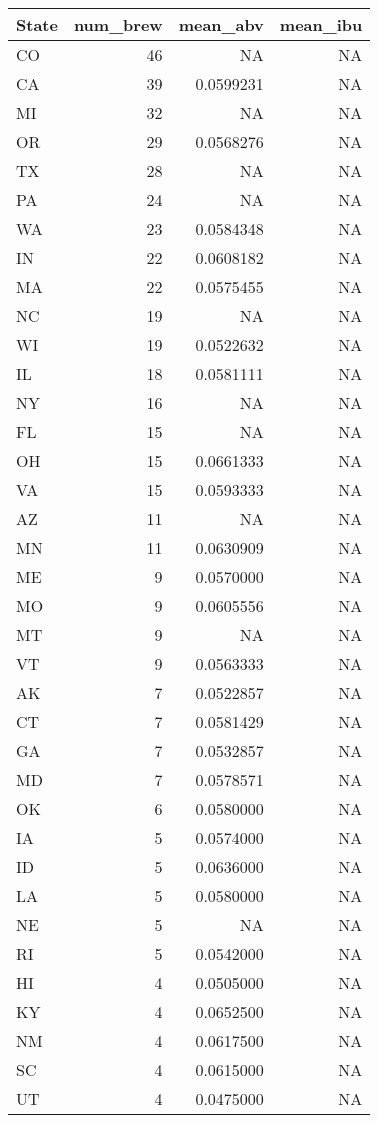 \documentclass[
]{article}
\begin{document}
\begin{longtable}[]{@{}lrrr@{}}
\toprule()
State & num\_brew & mean\_abv & mean\_ibu \\
\midrule()
\endhead
CO & 46 & NA & NA \\
CA & 39 & 0.0599231 & NA \\
MI & 32 & NA & NA \\
OR & 29 & 0.0568276 & NA \\
TX & 28 & NA & NA \\
PA & 24 & NA & NA \\
WA & 23 & 0.0584348 & NA \\
IN & 22 & 0.0608182 & NA \\
MA & 22 & 0.0575455 & NA \\
NC & 19 & NA & NA \\
WI & 19 & 0.0522632 & NA \\
IL & 18 & 0.0581111 & NA \\
NY & 16 & NA & NA \\
FL & 15 & NA & NA \\
OH & 15 & 0.0661333 & NA \\
VA & 15 & 0.0593333 & NA \\
AZ & 11 & NA & NA \\
MN & 11 & 0.0630909 & NA \\
ME & 9 & 0.0570000 & NA \\
MO & 9 & 0.0605556 & NA \\
MT & 9 & NA & NA \\
VT & 9 & 0.0563333 & NA \\
AK & 7 & 0.0522857 & NA \\
CT & 7 & 0.0581429 & NA \\
GA & 7 & 0.0532857 & NA \\
MD & 7 & 0.0578571 & NA \\
OK & 6 & 0.0580000 & NA \\
IA & 5 & 0.0574000 & NA \\
ID & 5 & 0.0636000 & NA \\
LA & 5 & 0.0580000 & NA \\
NE & 5 & NA & NA \\
RI & 5 & 0.0542000 & NA \\
HI & 4 & 0.0505000 & NA \\
KY & 4 & 0.0652500 & NA \\
NM & 4 & 0.0617500 & NA \\
SC & 4 & 0.0615000 & NA \\
UT & 4 & 0.0475000 & NA \\

\end{longtable}
\end{document}

